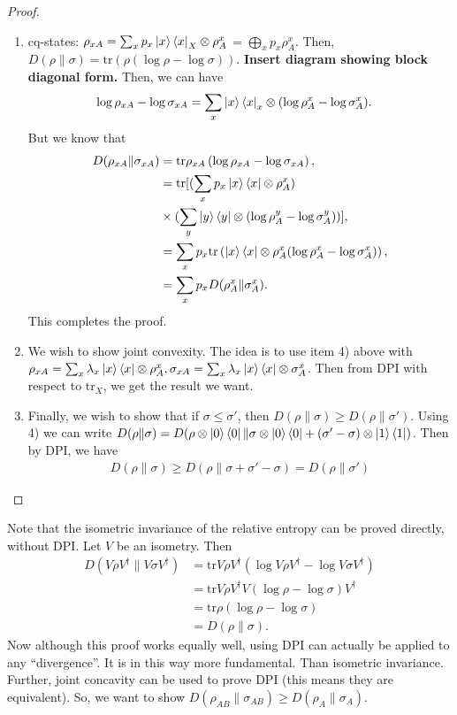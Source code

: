 \documentclass[notoc]{tufte-book}
\begin{document}
\begin{proof}
\begin{enumerate}
\item cq-states: $\rho_{xA} = \sum_x p_x \ket{x}\bra{x}_X \otimes \rho_A^x$ = $\bigoplus_x p_x \rho_A^x$. Then, $D(\rho \| \sigma) = \text{tr}\left(\rho (\log \rho - \log \sigma)\right)$. \textbf{Insert diagram showing block diagonal form.} Then, we can have
\begin{align}
    \log{\rho_{xA}} - \log{\sigma_{xA}} &= \sum_x \ket{x}\bra{x}_x \otimes (\log{\rho_A^x} - \log{\sigma_A^x}).
\end{align}
But we know that
\begin{align}
    D(\rho_{xA} \| \sigma_{xA}) &=\text{tr} \rho_{xA} \left(\log{\rho_{xA}} - \log{\sigma_{xA}}\right),\\
    &= \text{tr}[(\sum_x p_x \ket{x}\bra{x}\otimes \rho^x_A)\\
    &\times (\sum_y \ket{y}\bra{y} \otimes (\log \rho_A^y-\log \sigma_A^y))],\\
    &= \sum_x p_x \text{tr}\left(\ket{x}\bra{x} \otimes \rho_A^x (\log{\rho_A^x - \log{\sigma_A^x}})\right),\\
    &= \sum_x p_x D(\rho_A^x \| \sigma_A^x).
\end{align}
This completes the proof. 
\item We wish to show joint convexity. The idea is to use item 4) above with $\rho_{xA} = \sum_x \lambda_x \ket{x}\bra{x} \otimes \rho_{A}^x, \sigma_{xA} = \sum_x \lambda_x \ket{x}\bra{x} \otimes \sigma_A^x$. Then from DPI with respect to $\text{tr}_X$, we get the result we want.

\item Finally, we wish to show that if $\sigma \leq \sigma'$, then $D(\rho \| \sigma) \geq D(\rho \| \sigma')$. Using 4) we can write $
    D(\rho \| \sigma) = D(\rho \otimes \ket{0}\bra{0} \| \sigma \otimes \ket{0}\bra{0} +(\sigma'-\sigma)\otimes \ket{1}\bra{1})$. Then by DPI, we have
    \begin{align}
        D(\rho \| \sigma) \geq D(\rho \| \sigma +\sigma' -\sigma) = D(\rho \|\sigma')
    \end{align}
\end{enumerate}
\end{proof}

Note that the isometric invariance of the relative entropy can be proved directly, without DPI. Let $V$ be an isometry. Then
\begin{align}
    D(V\rho V^{\dagger} \| V \sigma V^{\dagger}) &= \text{tr} V\rho V^{\dagger} (\log V\rho V^{\dagger}-\log V \sigma V^{\dagger}) \\
    &= \text{tr}V\rho V^{\dagger} V(\log \rho - \log \sigma)V^{\dagger} \\
    &= \text{tr} \rho (\log \rho - \log \sigma) \\
    &= D(\rho \| \sigma).
\end{align}
Now although this proof works equally well, using DPI can actually be applied to any ``divergence''. It is in this way more fundamental. Than isometric invariance. Further, joint concavity can be used to prove DPI (this means they are equivalent). So, we want to show $D(\rho_{AB} \| \sigma_{AB}) \geq D(\rho_A \| \sigma_A)$. 
\end{document}
